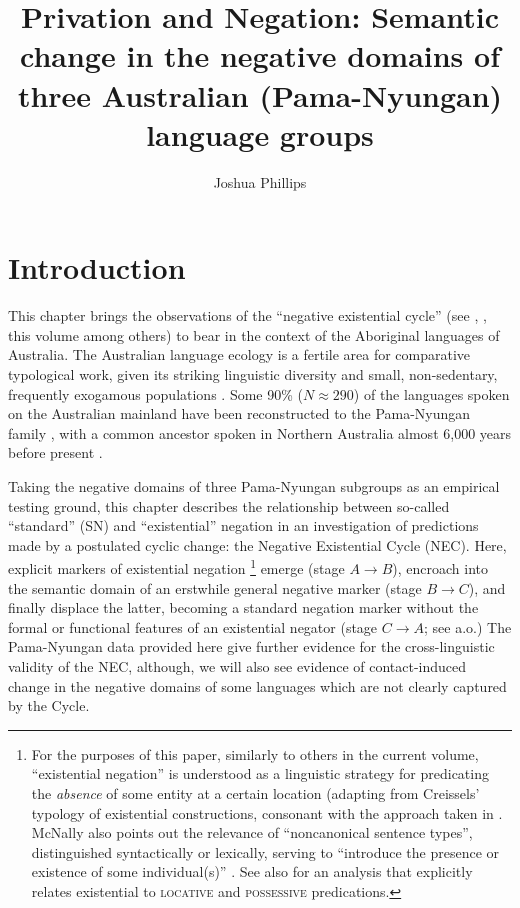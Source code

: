 \documentclass[output=paper,draft,draftmode,colorlinks,citecolor=brown]{langscibook}
\title{Privation and Negation: Semantic change in the negative domains of three Australian (Pama-Nyungan) language groups}
\author{Joshua Phillips\affiliation{Yale University}}
\begin{document}
\AffiliationsWithoutIndexing{}
\maketitle

\section{Introduction}\label{sec:austr-1}

This chapter brings the observations of the ``negative existential cycle''
(see \citealt{Croft1991}, \citealt{Veselinova2013,Veselinova2016}, this
volume among others) to bear in the context of the Aboriginal languages of
Australia. The Australian language ecology is a fertile area for
comparative typological work, given its striking linguistic diversity and
small, non-sedentary, frequently exogamous populations \citep{Bowern2010}.
Some 90\% ($N\approx290$) of the languages spoken on the Australian
mainland have been reconstructed to the Pama-Nyungan family \parencites(see
also)(){OVV1966}{Wurm1972}{BowernAtkinson2012}, with a common ancestor spoken in Northern Australia almost 6,000 years before present \citep{BouckaertBowern2018}.

Taking the negative domains of three Pama-Nyungan subgroups as an empirical
testing ground, this chapter describes the relationship between
so-called ``standard'' (SN) and ``existential'' negation in an
investigation of predictions made by a postulated cyclic change: the
Negative Existential Cycle (NEC). Here, explicit markers of existential 
negation%
    \footnote{For the purposes of this paper, similarly to others in the current volume, ``existential negation'' is understood as a linguistic strategy for predicating the \textit{absence} of some entity at a certain location (adapting from Creissels' \citeyearpar[2]{Creissels2014} typology of existential constructions, consonant with the approach taken in \citealp[139]{Veselinova2013}. McNally also points out the relevance of ``noncanonical sentence types'', distinguished syntactically or lexically, serving to ``introduce the presence or existence of some individual(s)'' \citeyearpar[210]{McNally2016}. See also \citealt{Freeze1992} for an analysis that explicitly relates existential to \textsc{locative} and \textsc{possessive} predications.} 
%
emerge (stage $A\to B$), encroach into the semantic domain of an erstwhile general negative marker (stage $B\to C$), and finally displace the latter, becoming a standard negation marker without the formal or functional features of an existential negator (stage $C\to A$; see \citealt{Croft1991,Veselinova2016} a.o.) The Pama-Nyungan data provided here give further evidence for the cross-linguistic validity of the NEC, although, we will also see evidence of contact-induced change in the negative domains of some languages which are not clearly captured by the Cycle.
\end{document}
